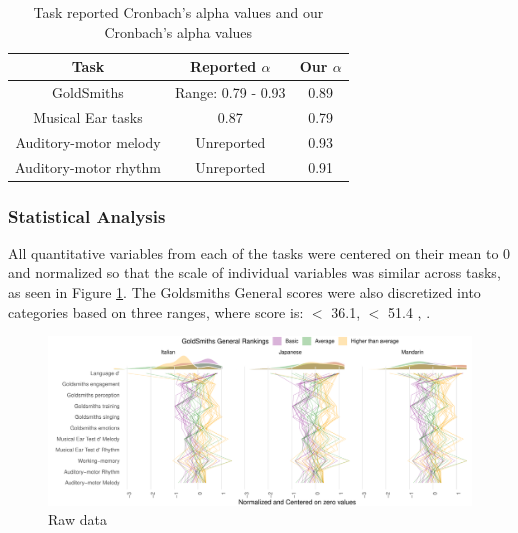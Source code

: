 \documentclass[a4paper]{article}
\begin{document}
\setlength{\abovedisplayskip}{-10pt}
\setlength{\belowdisplayskip}{-10pt}
\setlength{\abovetopsep}{-10pt}
\setlength{\belowbottomsep}{-10pt}
\begin{table}[h]
\centering
\begin{tabular}{|c|c|c|}
\hline
\textbf{Task} & \textbf{Reported $\alpha$}& \textbf{Our $\alpha$} \\
\hline
GoldSmiths \cite{Müllensiefen_Gingras_Musil_Stewart_2014} & Range: 0.79 - 0.93 & 0.89 \\
Musical Ear tasks \cite{Wallentin_Nielsen_Friis-Olivarius_Vuust_Vuust_2010}& 0.87 & 0.79 \\
Auditory-motor melody \cite{Kachlicka_Saito_Tierney_2019}& Unreported & 0.93 \\
Auditory-motor rhythm\cite{Kachlicka_Saito_Tierney_2019}& Unreported & 0.91 \\
\hline
\end{tabular}
\caption{Task reported Cronbach's alpha values and our Cronbach's alpha values}
\label{tab:comparison}
\end{table}

\vspace{-\baselineskip}

\subsubsection{Statistical Analysis}

All quantitative variables from each of the tasks were centered on their mean to 0 and normalized so that the scale of individual variables was similar across tasks, as seen in Figure \ref{fig:centered_data}. The Goldsmiths General scores were also discretized into categories based on three ranges, where score is:  $<$ 36.1, \quad {} $<$ 51.4  , \quad {}  \cite{Müllensiefen_Gingras_Musil_Stewart_2014}. 

\begin{figure}[t]
  \centering
  \includegraphics[width=.9\textwidth]{SP_24_visuals/by_gs.pdf}
  \caption{Raw data}
  \label{fig:centered_data}
\end{figure}
\end{document}
